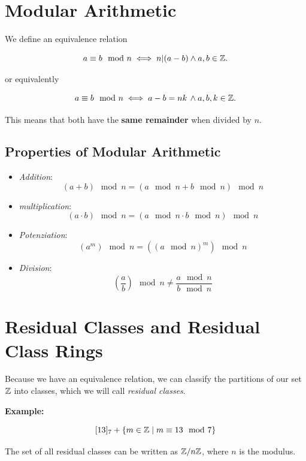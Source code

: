 \section{Modular Arithmetic}

We define an equivalence relation

\[
	a \equiv b \mod n \iff n | (a - b) \land  a,b \in \mathbb{Z}.
\]

or equivalently

\[
	a \equiv b \mod n \iff  a - b = nk\, \land  a,b,k \in \mathbb{Z}.
\]

This means that both have the \textbf{same remainder} when divided by \(n\).

\subsection{Properties of Modular Arithmetic}

\begin{itemize}

	\item  \emph{Addition}:
	      \[
		      (a + b) \mod n = (a \mod n + b \mod n) \mod n
	      \]

	\item \emph{multiplication}:
	      \[
		      (a \cdot b) \mod n = (a \mod n \cdot b \mod n) \mod n
	      \]

	\item \emph{Potenziation}:
	      \[
		      (a^m) \mod n = ({(a \mod n)}^m) \mod n
	      \]

	\item \emph{Division}:
	      \[
		      \left(\frac{a}{b}\right) \mod n \ne  \frac{a \mod n}{b \mod n}
	      \]

\end{itemize}


\section{Residual Classes and Residual Class Rings}

Because we have an equivalence relation, we can classify the partitions of our set \(\mathbb{Z}\) into classes, which we will call \emph{residual classes}.

\textbf{Example:}

\[
	[13]_7 + \{m \in \mathbb{Z} \mid m \equiv 13 \mod 7\}
\]

The set of all residual classes can be written as \(\mathbb{Z} / n \mathbb{Z}\), where \(n\) is the modulus.


